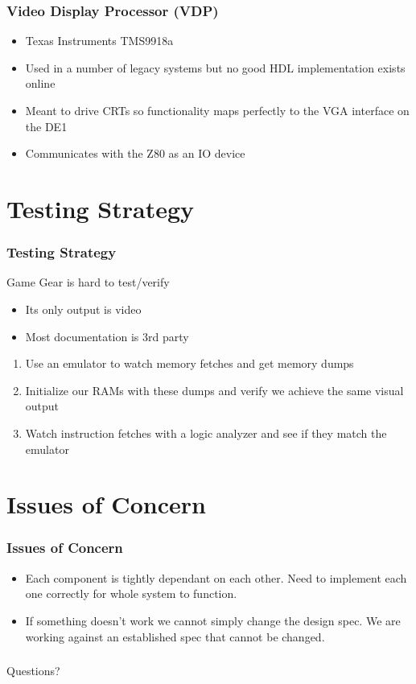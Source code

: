 \documentclass{beamer}
\newlength{\wideitemsep}
\let\olditem\item
\renewcommand{\item}{\setlength{\itemsep}{\wideitemsep}\olditem}
\begin{document}
\begin{frame}
    \frametitle{Video Display Processor (VDP)}

    \begin{itemize}
        \item<1-> Texas Instruments TMS9918a
        \item<2-> Used in a number of legacy systems but no good HDL implementation exists online
        \item<3-> Meant to drive CRTs so functionality maps perfectly to the VGA interface on the DE1
        \item<4-> Communicates with the Z80 as an IO device
    \end{itemize}
    \vspace{0.5cm}

\end{frame}

\section{Testing Strategy}
\begin{frame}
    \frametitle{Testing Strategy}
    Game Gear is hard to test/verify
    \begin{itemize}
        \olditem<2-> Its only output is video
        \olditem<3-> Most documentation is 3rd party
    \end{itemize}
    \vspace{0.25cm}
    \begin{enumerate}
        \olditem<5-> Use an emulator to watch memory fetches and get memory dumps
        \olditem<6-> Initialize our RAMs with these dumps and verify we achieve the same visual output
        \olditem<7-> Watch instruction fetches with a logic analyzer and see if they match the emulator
    \end{enumerate}
    \vspace{0.25cm}
\end{frame}

\section{Issues of Concern}
\begin{frame}
    \frametitle{Issues of Concern}
    \begin{itemize}
        \item Each component is tightly dependant on each other. Need to implement each one
        correctly for whole system to function.
        \item If something doesn't work we cannot simply change the design spec. We are working
            against an established spec that cannot be changed.
    \end{itemize}
\end{frame}

\begin{frame}
\frametitle{}
    \begin{center}
        \Huge
        Questions?
    \end{center}
\end{frame}
\end{document}
